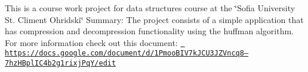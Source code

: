 This is a course work project for data structures course at the \char`\"{}\+Sofia University St. Climent Ohridski\char`\"{} Summary\+: The project consists of a simple application that has compression and decompression functionality using the huffman algorithm. For more information check out this document\+: \href{https://docs.google.com/document/d/1PmooBIV7kJCU3JZVncq8&ndash;7hzHBplIC4b2g1rixjPqY/edit}{\texttt{ https\+://docs.\+google.\+com/document/d/1\+Pmoo\+B\+I\+V7k\+J\+C\+U3\+J\+Z\+Vncq8--7hz\+H\+Bpl\+I\+C4b2g1rixj\+Pq\+Y/edit}} 